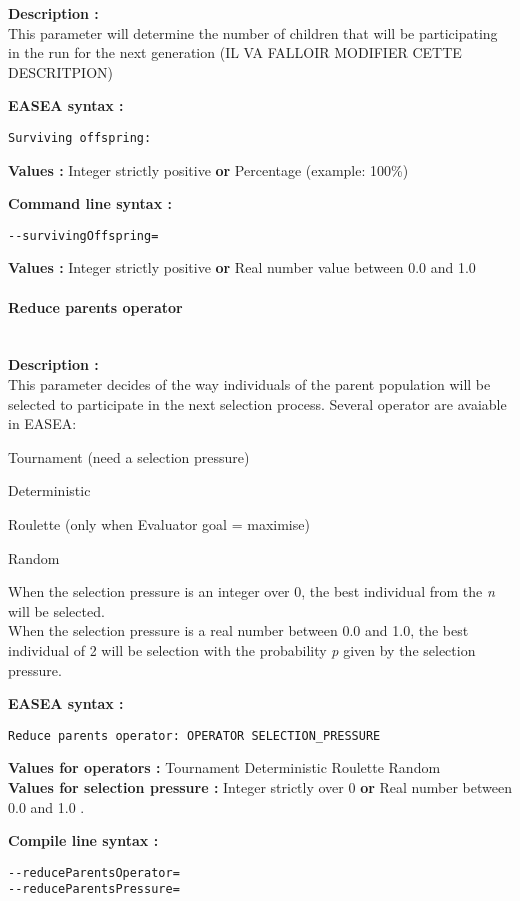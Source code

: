 \documentclass{book}
\begin{document}
\textbf{Description :}\\This parameter will determine the number of
children that will be participating in the run for the next generation
(IL VA FALLOIR MODIFIER CETTE DESCRITPION)

\textbf{EASEA syntax :}

\texttt{Surviving~offspring:}

\textbf{Values :} Integer strictly positive \textbf{or} Percentage
(example: 100\%)

\textbf{Command line syntax :}

\texttt{-{}-survivingOffspring=}

\textbf{Values :} Integer strictly positive \textbf{or} Real number
value between 0.0 and 1.0

\paragraph{Reduce parents operator}\label{reduce-parents-operator}
~\\

\textbf{Description :}\\This parameter decides of the way individuals of
the parent population will be selected to participate in the next
selection process. Several operator are avaiable in EASEA:

Tournament (need a selection pressure)

Deterministic

Roulette (only when Evaluator goal = maximise)

Random

When the selection pressure is an integer over 0, the best individual
from the \emph{n} will be selected.\\When the selection pressure is a
real number between 0.0 and 1.0, the best individual of 2 will be
selection with the probability \emph{p} given by the selection pressure.

\textbf{EASEA syntax :}

\texttt{Reduce~parents~operator:~OPERATOR~SELECTION\_PRESSURE}

\textbf{Values for operators :} Tournament Deterministic Roulette
Random\\\textbf{Values for selection pressure :} Integer strictly over 0
\textbf{or} Real number between 0.0 and 1.0 .

\textbf{Compile line syntax :}

\texttt{-{}-reduceParentsOperator=}\\\texttt{-{}-reduceParentsPressure=}
\end{document}
